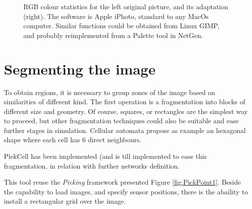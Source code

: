\begin{figure}[hbtp]
\begin{center}
\begin{minipage}{6cm}
\begin{center}
\end{center}
\end{minipage}
\caption{RGB colour statistics for the left original picture, and its adaptation (right). The software
is Apple iPhoto, standard to any MacOs computer. Similar functions could be obtained from Linux GIMP,
and probably reimplemented from a Palette tool in NetGen.}
\label{fig:colours1+2}
\end{center}
\end{figure}
  
\section { Segmenting the image}

To obtain regions, it is necessary to group zones of the image based on similarities of different kind.
The first operation is a fragmentation into blocks of different size and geometry. Of course,
squares, or rectangles are the simplest way to proceed, but other fragmentation techniques could also
be suitable and ease further stages in simulation. Cellular automata propose as example  an hexagonal
shape where each cell has 6 direct neighbours.

{\sc PickCell} has been implemented (and is till implemented to ease this fragmentation, in relation with 
further networks definition.

This tool reuse the {\sl Picking} framework presented Figure  \ref{fig:PickPoint1}. Beside the capability
to load images, and specify sensor positions, there is the abaility to install a rectangular grid over the
image.


